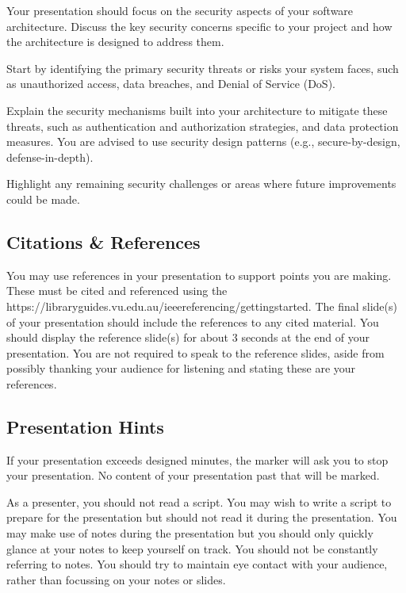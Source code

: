 \documentclass{csse4400}
\begin{document}
Your presentation should focus on the security aspects of your software architecture. Discuss the key security concerns specific to your project and how the architecture is designed to address them.

Start by identifying the primary security threats or risks your system faces, such as unauthorized access, data breaches, and Denial of Service (DoS).

Explain the security mechanisms built into your architecture to mitigate these threats, such as authentication and authorization strategies, and data protection measures.
You are advised to use security design patterns (e.g., secure-by-design, defense-in-depth).

Highlight any remaining security challenges or areas where future improvements could be made.



\subsection{Citations \& References}
You may use references in your presentation to support points you are making.
These must be cited and referenced using the 
{https://libraryguides.vu.edu.au/ieeereferencing/gettingstarted}.
The final slide(s) of your presentation should include the references to any cited material.
You should display the reference slide(s) for about 3 seconds at the end of your presentation.
You are not required to speak to the reference slides,
aside from possibly thanking your audience for listening and stating these are your references.


\subsection{Presentation Hints}

If your presentation exceeds designed minutes, the marker will ask you to stop your presentation.
No content of your presentation past that will be marked.

As a presenter, you should not read a script.
You may wish to write a script to prepare for the presentation but should not read it during the presentation.
You may make use of notes during the presentation but you should only quickly glance at your notes to keep yourself on track.
You should not be constantly referring to notes.
You should try to maintain eye contact with your audience, rather than focussing on your notes or slides.
\end{document}
